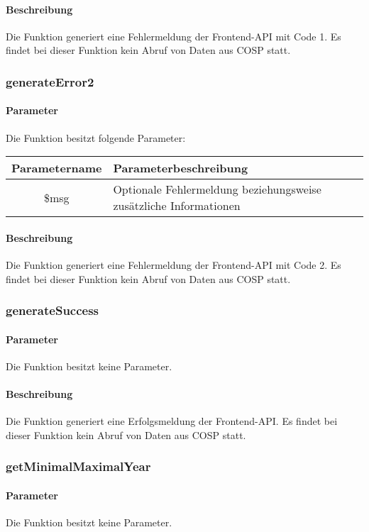 \paragraph{Beschreibung} Die Funktion generiert eine Fehlermeldung der Frontend-API mit Code 1. Es findet bei dieser Funktion kein Abruf von Daten aus {\glqq COSP\grqq} statt.
\subsubsection{generateError2}
\paragraph{Parameter} Die Funktion besitzt folgende Parameter:
\begin{table}[H]
	\begin{tabular}{|c|p{11cm}|}
		\hline
		\textbf{Parametername} & \textbf{Parameterbeschreibung} \\ \hline
		\$msg & Optionale Fehlermeldung beziehungsweise zusätzliche Informationen \\ \hline
	\end{tabular}
\end{table}
\paragraph{Beschreibung} Die Funktion generiert eine Fehlermeldung der Frontend-API mit Code 2. Es findet bei dieser Funktion kein Abruf von Daten aus {\glqq COSP\grqq} statt.
\subsubsection{generateSuccess}
\paragraph{Parameter} Die Funktion besitzt keine Parameter.
\paragraph{Beschreibung} Die Funktion generiert eine Erfolgsmeldung der Frontend-API. Es findet bei dieser Funktion kein Abruf von Daten aus {\glqq COSP\grqq} statt.
\subsubsection{getMinimalMaximalYear}
\paragraph{Parameter} Die Funktion besitzt keine Parameter.
